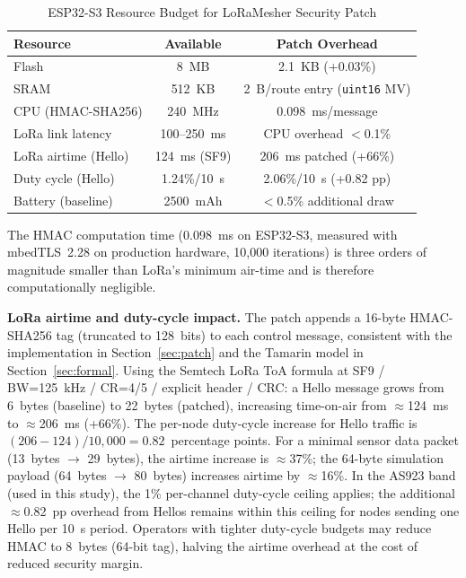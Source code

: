 \documentclass[10pt,journal,compsoc]{IEEEtran}
\begin{document}
\begin{table}[t]
  \centering
  \caption{ESP32-S3 Resource Budget for LoRaMesher Security Patch}
  \label{tab:esp32}
  \begin{tabular}{lcc}
    \toprule
    \textbf{Resource} & \textbf{Available} & \textbf{Patch Overhead} \\
    \midrule
    Flash              & 8~MB             & 2.1~KB (+0.03\%) \\
    SRAM               & 512~KB           & 2~B/route entry (\texttt{uint16} MV) \\
    CPU (HMAC-SHA256)  & 240~MHz          & 0.098~ms/message \\
    LoRa link latency  & 100–250~ms       & CPU overhead $<$0.1\% \\
    LoRa airtime (Hello) & 124~ms (SF9)  & 206~ms patched (+66\%) \\
    Duty cycle (Hello) & 1.24\%/10~s    & 2.06\%/10~s (+0.82 pp) \\
    Battery (baseline) & 2500~mAh         & $<$0.5\% additional draw \\
    \bottomrule
  \end{tabular}
\end{table}

The HMAC computation time (0.098~ms on ESP32-S3, measured with
mbedTLS~2.28 on production hardware, 10{,}000 iterations) is three
orders of magnitude smaller than LoRa's minimum air-time and is
therefore computationally negligible.

\textbf{LoRa airtime and duty-cycle impact.}
The patch appends a 16-byte HMAC-SHA256 tag (truncated to 128~bits)
to each control message, consistent with the implementation
in Section~\ref{sec:patch} and the Tamarin model in
Section~\ref{sec:formal}. Using the Semtech LoRa ToA formula at
SF9 / BW=125~kHz / CR=4/5 / explicit header / CRC:
a Hello message grows from 6~bytes (baseline) to 22~bytes (patched),
increasing time-on-air from $\approx$124~ms to $\approx$206~ms
(+66\%). The per-node duty-cycle increase for Hello traffic is
$(206-124)/10{,}000 = 0.82$~percentage points. For a minimal sensor data packet
(13~bytes $\to$ 29~bytes), the airtime increase is $\approx$37\%;
the 64-byte simulation payload (64~bytes $\to$ 80~bytes) increases
airtime by $\approx$16\%.
In the AS923 band (used in this study), the 1\% per-channel
duty-cycle ceiling applies; the additional $\approx$0.82~pp overhead
from Hellos remains within this ceiling for nodes sending one Hello
per 10~s period. Operators with tighter duty-cycle budgets may
reduce HMAC to 8~bytes (64-bit tag), halving the airtime overhead
at the cost of reduced security margin.
\end{document}
